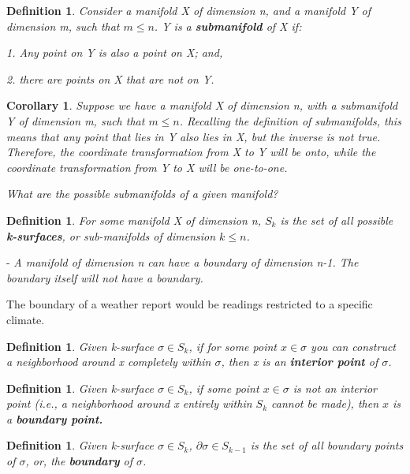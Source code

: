\documentclass{book}
\newtheorem{defn}[equation]{Definition}
\newtheorem{coro}[equation]{Corollary}
\begin{document}
\begin{defn}
	Consider a manifold X of dimension n, and a manifold Y of dimension m, such that $m \leq n$. Y is a \textbf{submanifold} of X if:
	
	1. Any point on Y is also a point on X; and,
	
	2. there are points on X that are not on Y. 
\end{defn}

\begin{coro}
	Suppose we have a manifold X of dimension n, with a submanifold Y of dimension m, such that $m \leq n$. Recalling the definition of submanifolds, this means that any point that lies in Y also lies in X, but the inverse is not true. Therefore, the coordinate transformation from X to Y will be onto, while the coordinate transformation from Y to X will be one-to-one. 
\end{coro}


\emph{What are the possible submanifolds of a given manifold?}


\begin{defn}
	For some manifold X of dimension n, $S_k$ is the set of all possible \textbf{k-surfaces}, or sub-manifolds of dimension $k \leq n$. 
\end{defn}

- \emph{A manifold of dimension n can have a boundary of dimension n-1. The boundary itself will not have a boundary.}

The boundary of a weather report would be readings restricted to a specific climate. 


\begin{defn}
	Given k-surface $\sigma \in S_k$, if for some point $x \in \sigma$ you can construct a neighborhood around x completely within $\sigma$, then x is an \textbf{interior point} of $\sigma$. 
\end{defn}

\begin{defn}
	Given k-surface $\sigma \in S_k$, if some point $x \in \sigma$ is not an interior point (i.e., a neighborhood around x entirely within $S_k$ cannot be made), then $x$ is a \textbf{boundary point. }
\end{defn}

\begin{defn}
	Given k-surface $\sigma \in S_k$, $\partial\sigma \in S_{k-1}$ is the set of all boundary points of $\sigma$, or, the \textbf{boundary} of $\sigma$. 
\end{defn}
\end{document}
